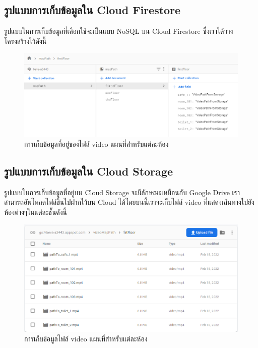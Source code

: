 \subsection{รูปแบบการเก็บข้อมูลใน Cloud Firestore}
รูปแบบในการเก็บข้อมูลที่เลือกใช้จะเป็นแบบ NoSQL บน Cloud Firestore ซึ่งเราได้วางโครงสร้างไว้ดังนี้
\begin{figure}[hbt!]
  \begin{center}
    \includegraphics[width=\textwidth,keepaspectratio]{pic/database_mapPath.png}
  \end{center}
  \caption{การเก็บข้อมูลที่อยู่ของไฟล์ video แผนที่สำหรับแต่ละห้อง}
  \label{fig:db_mapPath}
\end{figure}

\subsection{รูปแบบการเก็บข้อมูลใน Cloud Storage}
รูปแบบในการเก็บข้อมูลที่อยู่บน Cloud Storage จะมีลักษณะเหมือนกับ Google Drive เราสามารถอัพโหลดไฟล์ขึ้นไปฝากไว้บน Cloud
ได้โดยบนนี้เราจะเก็บไฟล์ video ที่แสดงเส้นทางไปยังห้องต่างๆในแต่ละชั้นดังนี้
\begin{figure}[hbt!]
  \begin{center}
    \includegraphics[width=\textwidth,keepaspectratio]{pic/db_storage.png}
  \end{center}
  \caption{การเก็บข้อมูลไฟล์ video แผนที่สำหรับแต่ละห้อง}
  \label{fig:db_storage}
\end{figure}

